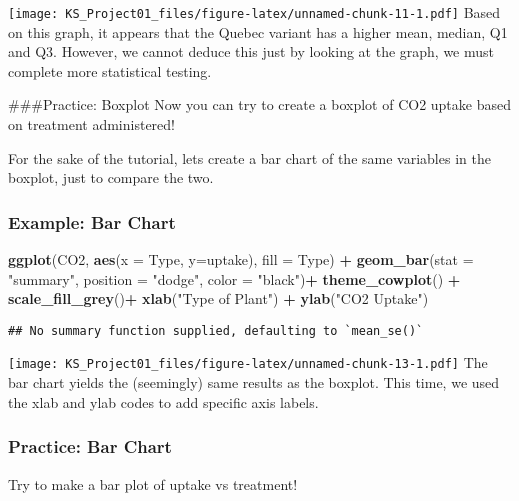 \documentclass[
]{article}
\newenvironment{Shaded}{\begin{snugshade}}{\end{snugshade}}
\newcommand{\AttributeTok}[1]{\textcolor[rgb]{0.13,0.29,0.53}{#1}}
\newcommand{\FunctionTok}[1]{\textcolor[rgb]{0.13,0.29,0.53}{\textbf{#1}}}
\newcommand{\NormalTok}[1]{#1}
\newcommand{\SpecialCharTok}[1]{\textcolor[rgb]{0.81,0.36,0.00}{\textbf{#1}}}
\newcommand{\StringTok}[1]{\textcolor[rgb]{0.31,0.60,0.02}{#1}}
\begin{document}
\texttt{[image: KS\_Project01\_files/figure-latex/unnamed-chunk-11-1.pdf]}
Based on this graph, it appears that the Quebec variant has a higher
mean, median, Q1 and Q3. However, we cannot deduce this just by looking
at the graph, we must complete more statistical testing.

\#\#\#Practice: Boxplot Now you can try to create a boxplot of CO2
uptake based on treatment administered!

For the sake of the tutorial, lets create a bar chart of the same
variables in the boxplot, just to compare the two.

\subsubsection{Example: Bar Chart}\label{example-bar-chart}

\begin{Shaded}
\begin{Highlighting}[]
\FunctionTok{ggplot}\NormalTok{(CO2, }\FunctionTok{aes}\NormalTok{(}\AttributeTok{x =}\NormalTok{ Type, }\AttributeTok{y=}\NormalTok{uptake), }\AttributeTok{fill =}\NormalTok{ Type) }\SpecialCharTok{+} \FunctionTok{geom\_bar}\NormalTok{(}\AttributeTok{stat =} \StringTok{"summary"}\NormalTok{, }\AttributeTok{position =} \StringTok{"dodge"}\NormalTok{, }\AttributeTok{color =} \StringTok{"black"}\NormalTok{)}\SpecialCharTok{+} \FunctionTok{theme\_cowplot}\NormalTok{() }\SpecialCharTok{+} \FunctionTok{scale\_fill\_grey}\NormalTok{()}\SpecialCharTok{+} \FunctionTok{xlab}\NormalTok{(}\StringTok{"Type of Plant"}\NormalTok{) }\SpecialCharTok{+} \FunctionTok{ylab}\NormalTok{(}\StringTok{"CO2 Uptake"}\NormalTok{)}
\end{Highlighting}
\end{Shaded}

\begin{verbatim}
## No summary function supplied, defaulting to `mean_se()`
\end{verbatim}

\texttt{[image: KS\_Project01\_files/figure-latex/unnamed-chunk-13-1.pdf]}
The bar chart yields the (seemingly) same results as the boxplot. This
time, we used the xlab and ylab codes to add specific axis labels.

\subsubsection{Practice: Bar Chart}\label{practice-bar-chart}

Try to make a bar plot of uptake vs treatment!
\end{document}
